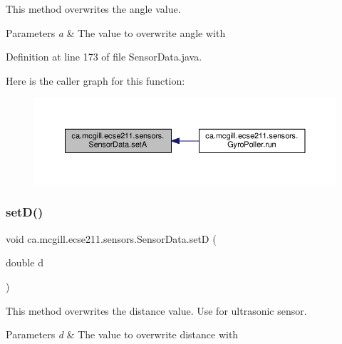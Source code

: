 This method overwrites the angle value.


\begin{DoxyParams}{Parameters}
{\em a} & The value to overwrite angle with \\
\hline
\end{DoxyParams}


Definition at line 173 of file Sensor\+Data.\+java.

Here is the caller graph for this function\+:
\nopagebreak
\begin{figure}[H]
\begin{center}
\leavevmode
\includegraphics[width=350pt]{classca_1_1mcgill_1_1ecse211_1_1sensors_1_1_sensor_data_a9828d8b4dfb9b197e8fd149fb7deb63b_icgraph}
\end{center}
\end{figure}
\mbox{\label{classca_1_1mcgill_1_1ecse211_1_1sensors_1_1_sensor_data_ae20bf127c57dcfcb3b7632ca05b6d482}} 
\subsubsection{\texorpdfstring{set\+D()}{setD()}}
{\footnotesize\ttfamily void ca.\+mcgill.\+ecse211.\+sensors.\+Sensor\+Data.\+setD (\begin{DoxyParamCaption}\item[{double}]{d }\end{DoxyParamCaption})}

This method overwrites the distance value. Use for ultrasonic sensor.


\begin{DoxyParams}{Parameters}
{\em d} & The value to overwrite distance with \\
\hline
\end{DoxyParams}


